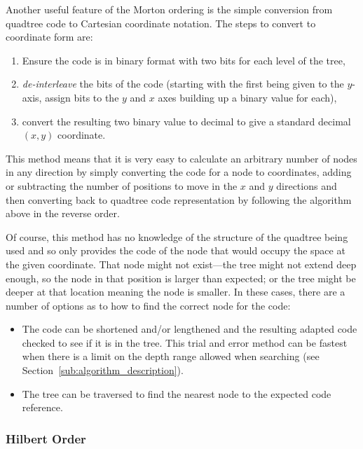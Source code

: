 Another useful feature of the Morton ordering is the simple conversion from
quadtree code to Cartesian coordinate notation. The steps to convert to
coordinate form are:

\begin{enumerate}
	\item Ensure the code is in binary format with two bits for each level of
		the tree,
	\item \emph{de-interleave} the bits of the code (starting with the first
		being given to the $y$-axis, assign bits to the $y$ and $x$ axes
		building up a binary value for each),
	\item convert the resulting two binary value to decimal to give a standard
		decimal $(x,y)$ coordinate.
\end{enumerate}

This method means that it is very easy to calculate an arbitrary number of
nodes in any direction by simply converting the code for a node to coordinates,
adding or subtracting the number of positions to move in the $x$ and $y$
directions and then converting back to quadtree code representation by
following the algorithm above in the reverse order.

Of course, this method has no knowledge of the structure of the quadtree being
used and so only provides the code of the node that would occupy the space at
the given coordinate. That node might not exist---the tree might not extend
deep enough, so the node in that position is larger than expected; or the tree
might be deeper at that location meaning the node is smaller. In these cases,
there are a number of options as to how to find the correct node for the code:

\begin{itemize}
	\item The code can be shortened and/or lengthened and the resulting adapted
		code checked to see if it is in the tree. This trial and error method
		can be fastest when there is a limit on the depth range allowed when
		searching (see Section~\ref{sub:algorithm_description}).
	\item The tree can be traversed to find the nearest node to the expected
		code reference.
\end{itemize}

\subsubsection{Hilbert Order}
\label{ssub:hilbert_order}

